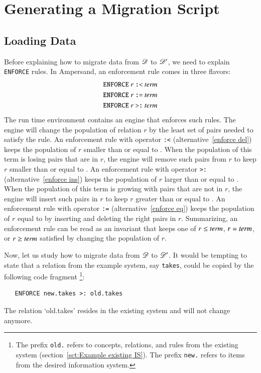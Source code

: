 \documentclass{elsarticle}
\begin{document}
\section*{Generating a Migration Script}
\subsection{Loading Data}
   Before explaining how to migrate data from $\mathscr{D}$ to $\mathscr{D}'$, we need to explain {\tt ENFORCE} rules.
   In Ampersand, an enforcement rule comes in three flavors:
\begin{eqnarray}
   \text{\tt ENFORCE}\ r\ \text{\tt :<}\ \text{\it term\/}\label{enforce del}\\
   \text{\tt ENFORCE}\ r\ \text{\tt :=}\ \text{\it term\/}\label{enforce eq}\\
   \text{\tt ENFORCE}\ r\ \text{\tt >:}\ \text{\it term\/}\label{enforce ins}
\end{eqnarray}
   The run time environment contains an engine that enforces such rules.
   The engine will change the population of relation $r$ by the least set of pairs needed to satisfy the rule.
   An enforcement rule with operator {\tt :<} (alternative~\ref{enforce del}) keeps the population of $r$ smaller than or equal to .
   When the population of this term is losing pairs that are in $r$, the engine will remove such pairs from $r$ to keep $r$ smaller than or equal to .
   An enforcement rule with operator {\tt >:} (alternative~\ref{enforce ins}) keeps the population of $r$ larger than or equal to .
   When the population of this term is growing with pairs that are not in $r$, the engine will insert such pairs in $r$ to keep $r$ greater than or equal to .
   An enforcement rule with operator {\tt :=} (alternative~\ref{enforce eq}) keeps the population of $r$ equal to  by inserting and deleting the right pairs in $r$.
   Summarizing, an enforcement rule can be read as an invariant that keeps one of $r\leq\text{\it term\/}$, $r=\text{\it term\/}$, or $r\geq\text{\it term\/}$ satisfied by changing the population of $r$.

   Now, let us study how to migrate data from $\mathscr{D}$ to $\mathscr{D}'$.
   It would be tempting to state that a relation from the example system, say {\tt takes}, could be copied by the following code fragment%
\footnote{The prefix {\tt old.} refers to concepts, relations, and rules from the existing system (section~\ref{sct:Example existing IS}).
The prefix {\tt new.} refers to items from the desired information system.}:
\begin{verbatim}
   ENFORCE new.takes >: old.takes
\end{verbatim}
   The relation `old.takes' resides in the existing system and will not change anymore.
   
\end{document}
